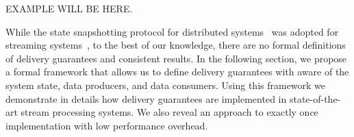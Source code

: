 EXAMPLE WILL BE HERE.

While the state snapshotting protocol for distributed systems~\cite{Chandy:1985:DSD:214451.214456} was adopted for streaming systems~\cite{2015arXiv150608603C}, to the best of our knowledge, there are no formal definitions of delivery guarantees and consistent results. In the following section, we propose a formal framework that allows us to define delivery guarantees with aware of the system state, data producers, and data consumers. Using this framework we demonstrate in details how delivery guarantees are implemented in state-of-the-art stream processing systems. We also reveal an approach to exactly once implementation with low performance overhead. 